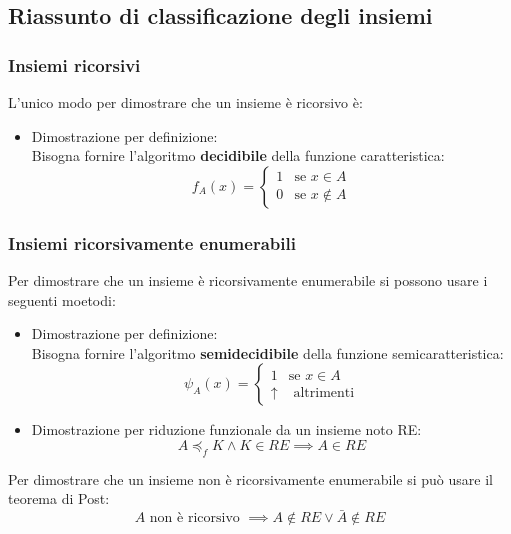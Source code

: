 \documentclass[a4paper]{article}
\begin{document}
\subsection{Riassunto di classificazione degli insiemi}
\subsubsection{Insiemi ricorsivi}
L'unico modo per dimostrare che un insieme è ricorsivo è:
\begin{itemize}
  \item Dimostrazione per definizione:\\
    Bisogna fornire l'algoritmo \textbf{decidibile}
    della funzione caratteristica:
    \[
      f_A(x) =
      \begin{cases}
        1 & \text{se } x \in A \\
        0 & \text{se } x \notin A
      \end{cases}
    \] 
\end{itemize}

\subsubsection{Insiemi ricorsivamente enumerabili}
Per dimostrare che un insieme è ricorsivamente enumerabile si possono usare i seguenti
moetodi:
\begin{itemize}
  \item Dimostrazione per definizione:\\
    Bisogna fornire l'algoritmo \textbf{semidecidibile}
    della funzione semicaratteristica:
    \[
      \psi_A(x) =
      \begin{cases}
        1 & \text{se } x \in A \\
        \uparrow & \text{ altrimenti}
      \end{cases}
    \]

  \item Dimostrazione per riduzione funzionale da un insieme noto RE:
    \[
      A \preceq_f K \land K \in RE \implies A \in RE
    \] 
\end{itemize}

\vspace{1em}
\noindent
Per dimostrare che un insieme non è ricorsivamente enumerabile si può usare il
teorema di Post:
\[
  A \text{ non è ricorsivo } \implies A \notin RE \vee \bar{A} \notin RE
\]
\end{document}
